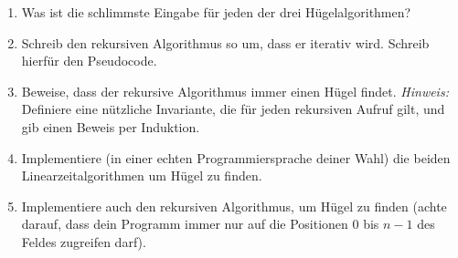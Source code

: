 \documentclass{uebung_cs}
\begin{document}
\begin{aufgabe}\label{thu-last}\mbox{}
	\begin{enumerate}
		\item Was ist die schlimmste Eingabe für jeden der drei Hügelalgorithmen?
		\item Schreib den rekursiven Algorithmus so um, dass er iterativ wird. Schreib hierfür den Pseudocode.
		\item Beweise, dass der rekursive Algorithmus immer einen Hügel findet. \emph{Hinweis:} Definiere eine nützliche Invariante, die für jeden rekursiven Aufruf gilt, und gib einen Beweis per Induktion.
		\item Implementiere (in einer echten Programmiersprache deiner Wahl) die beiden Linearzeitalgorithmen um Hügel zu finden.
		\item Implementiere auch den rekursiven Algorithmus, um Hügel zu finden (achte darauf, dass dein Programm immer nur auf die Positionen $0$ bis $n-1$ des Feldes zugreifen darf).
	\end{enumerate}
\end{aufgabe}
\end{document}
